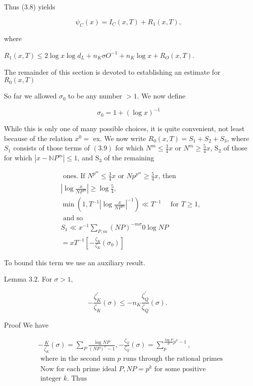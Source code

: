 Thus (3.8) yields

$$
\psi_{C}(x)=I_{C}(x, T)+R_{1}(x, T),
$$

where

$R_{1}(x, T) \leqslant 2 \log x \log d_{L}+n_{K} \sigma O^{-1}+n_{K} \log x+R_{O}(x, T)$.

The remainder of this section is devoted to establishing an estimate for $R_{0}(x, T)$

So far we allowed $\sigma_{0}$ to be any number $>1$. We now define

$$
\sigma_{0}=1+(\log x)^{-1}
$$

While this is only one of many possible choices, it is quite convenient, not least because of the relation $x^{0}=$ ex. We now write $R_{0}(x, T)=S_{1}+S_{2}+S_{3}$, where $S_{1}$ consists of those terms of $(3.9)$ for which $N^{m} \leqslant \frac{3}{4} x$ or $N^{m} \geqslant \frac{5}{4} x$, $\mathrm{S}_{2}$ of those for which $\left|x-\mathbb{N} P^{m}\right| \leqslant 1$, and $\mathrm{S}_{3}$ of the remaining 

$$
\begin{aligned}
& \text { ones. If } N^{p^{m}} \leqslant \frac{3}{4} x \text { or } N p^{p^{m}} \geqslant \frac{5}{4} x \text {, then } \\
& \left|\log \frac{x}{N P^{m}}\right| \geqslant \log \frac{5}{4}, \\
& \min \left(1, T^{-1}\left|\log \frac{x}{N P^{m}}\right|^{-1}\right) \ll T^{-1} \quad \text { for } T \geqslant 1 \text {, } \\
& \text { and so } \\
& S_{1} \ll x^{-1} \sum_{P, m}(N P)^{-m \sigma} 0 \log N P \\
& =x T^{-1}\left[-\frac{\zeta_{K}}{\zeta_{K}}\left(\sigma_{0}\right)\right]
\end{aligned}
$$

To bound this term we use an auxiliary result.

Lemma $3.2$. For $\sigma>1$,

$$
-\frac{\zeta_{K}^{\prime}}{\zeta_{K}}(\sigma) \leqslant-n_{K} \frac{\zeta_{Q}^{\prime}}{\zeta_{Q}}(\sigma) \text {. }
$$

Proof We have

$$
\begin{aligned}
&-\frac{K}{\zeta_{K}^{\prime}}(\sigma)=\sum_{P} \frac{\log N P}{(N P)^{\sigma}-1},-\frac{\zeta_{Q}}{\zeta_{Q}}(\sigma)=\sum_{p}^{\frac{\log P}{\sigma} p^{\sigma}-1}, \\
&\text { where in the second sum } p \text { runs through the rational primes } \\
&\text { Now for each prime ideal } P, N P=p^{k} \text { for some positive } \\
&\text { integer } k \text {. Thus }
\end{aligned}
$$



